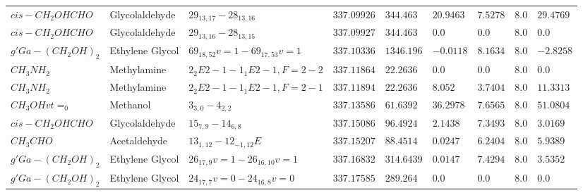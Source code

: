\documentclass[10pt]{article}
\begin{document}
\begin{table}[htb]
\begin{tabular}{l l l l l l l l l}
    $cis-CH_{2}OHCHO$ & Glycolaldehyde & $29_{13,17}-28_{13,16}$ & $337.09926$ & $344.463$ & $20.9463$ & $7.5278$ & $8.0$ & $29.4769$\\
    $cis-CH_{2}OHCHO$ & Glycolaldehyde & $29_{13,16}-28_{13,15}$ & $337.09927$ & $344.463$ & $0.0$ & $0.0$ & $8.0$ & $0.0$\\
    $g'Ga-(CH_{2}OH)_{2}$ & Ethylene Glycol & $69_{18,52}v=1-69_{17,53}v=1$ & $337.10336$ & $1346.196$ & $-0.0118$ & $8.1634$ & $8.0$ & $-2.8258$\\
    $CH_{3}NH_{2}$ & Methylamine & $2_{2}E2-1-1_{1}E2-1,F=2-2$ & $337.11864$ & $22.2636$ & $0.0$ & $0.0$ & $8.0$ & $0.0$\\
    $CH_{3}NH_{2}$ & Methylamine & $2_{2}E2-1-1_{1}E2-1,F=2-1$ & $337.11894$ & $22.2636$ & $8.052$ & $3.7404$ & $8.0$ & $11.3313$\\
    $CH_{3}OHvt=_{0}$ & Methanol & $3_{3,0}-4_{2,2}$ & $337.13586$ & $61.6392$ & $36.2978$ & $7.6565$ & $8.0$ & $51.0804$\\
    $cis-CH_{2}OHCHO$ & Glycolaldehyde & $15_{7,9}-14_{6,8}$ & $337.15086$ & $96.4924$ & $2.1438$ & $7.3493$ & $8.0$ & $3.0169$\\
    $CH_{3}CHO$ & Acetaldehyde & $13_{1,12}-12_{-1,12}E$ & $337.15207$ & $88.4514$ & $0.0247$ & $6.2404$ & $8.0$ & $5.9389$\\
    $g'Ga-(CH_{2}OH)_{2}$ & Ethylene Glycol & $26_{17,9}v=1-26_{16,10}v=1$ & $337.16832$ & $314.6439$ & $0.0147$ & $7.4294$ & $8.0$ & $3.5352$\\
    $g'Ga-(CH_{2}OH)_{2}$ & Ethylene Glycol & $24_{17,7}v=0-24_{16,8}v=0$ & $337.17585$ & $289.264$ & $0.0$ & $0.0$ & $8.0$ & $0.0$\\
    \hline                  
    \end{tabular}
\end{table}
\end{document}
